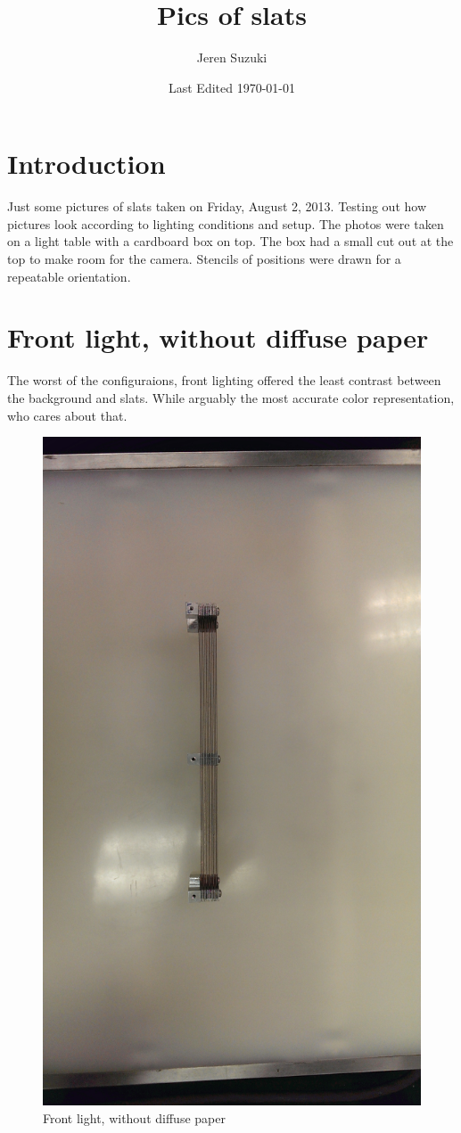 \documentclass[10pt]{scrartcl}
\title{Pics of slats}
\author{Jeren Suzuki}
\date{Last Edited \today}
\begin{document}
\maketitle
{}
\tableofcontents
\clearpage
{}

\section{Introduction} %
\label{sec:introduction}
Just some pictures of slats taken on Friday, August 2, 2013. Testing out how pictures look according to lighting conditions and setup. The photos were taken on a light table with a cardboard box on top. The box had a small cut out at the top to make room for the camera. Stencils of positions were drawn for a repeatable orientation.

\section{Front light, without diffuse paper} %
\label{sec:front_light_with_diffuse_paper}
The worst of the configuraions, front lighting offered the least contrast between the background and slats. While arguably the most accurate color representation, who cares about that. 

\begin{figure}[!ht]
    \centering
    \includegraphics[width=.7\textwidth]{../plots_tables_images/slats/IMAG0151.jpg}    
    \caption{Front light, without diffuse paper}
\end{figure}
\end{document}
